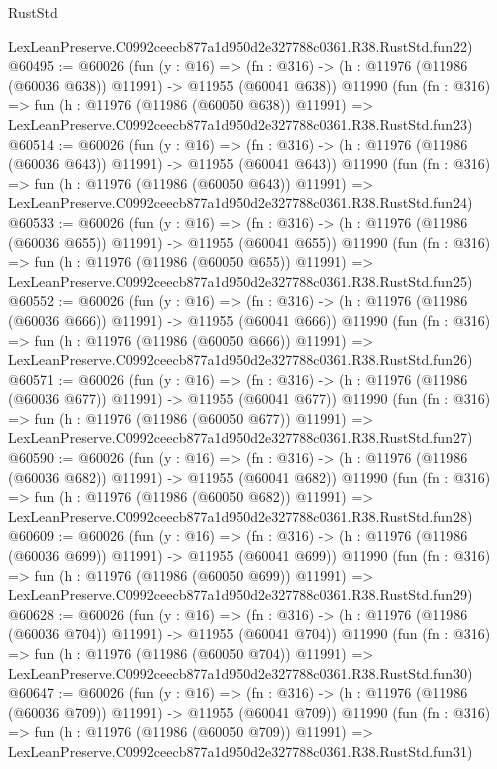\begin{lexlean}{RustStd}
\begin{coremodule}
    LexLeanPreserve.C0992ceecb877a1d950d2e327788c0361.R38.RustStd.fun22)
@60495 := @60026
    (fun (y : @16) =>
    (fn : @316) -> (h : @11976 (@11986 (@60036 @638)) @11991) -> @11955 (@60041 @638))
    @11990
    (fun (fn : @316) =>
    fun (h : @11976 (@11986 (@60050 @638)) @11991) =>
    LexLeanPreserve.C0992ceecb877a1d950d2e327788c0361.R38.RustStd.fun23)
@60514 := @60026
    (fun (y : @16) =>
    (fn : @316) -> (h : @11976 (@11986 (@60036 @643)) @11991) -> @11955 (@60041 @643))
    @11990
    (fun (fn : @316) =>
    fun (h : @11976 (@11986 (@60050 @643)) @11991) =>
    LexLeanPreserve.C0992ceecb877a1d950d2e327788c0361.R38.RustStd.fun24)
@60533 := @60026
    (fun (y : @16) =>
    (fn : @316) -> (h : @11976 (@11986 (@60036 @655)) @11991) -> @11955 (@60041 @655))
    @11990
    (fun (fn : @316) =>
    fun (h : @11976 (@11986 (@60050 @655)) @11991) =>
    LexLeanPreserve.C0992ceecb877a1d950d2e327788c0361.R38.RustStd.fun25)
@60552 := @60026
    (fun (y : @16) =>
    (fn : @316) -> (h : @11976 (@11986 (@60036 @666)) @11991) -> @11955 (@60041 @666))
    @11990
    (fun (fn : @316) =>
    fun (h : @11976 (@11986 (@60050 @666)) @11991) =>
    LexLeanPreserve.C0992ceecb877a1d950d2e327788c0361.R38.RustStd.fun26)
@60571 := @60026
    (fun (y : @16) =>
    (fn : @316) -> (h : @11976 (@11986 (@60036 @677)) @11991) -> @11955 (@60041 @677))
    @11990
    (fun (fn : @316) =>
    fun (h : @11976 (@11986 (@60050 @677)) @11991) =>
    LexLeanPreserve.C0992ceecb877a1d950d2e327788c0361.R38.RustStd.fun27)
@60590 := @60026
    (fun (y : @16) =>
    (fn : @316) -> (h : @11976 (@11986 (@60036 @682)) @11991) -> @11955 (@60041 @682))
    @11990
    (fun (fn : @316) =>
    fun (h : @11976 (@11986 (@60050 @682)) @11991) =>
    LexLeanPreserve.C0992ceecb877a1d950d2e327788c0361.R38.RustStd.fun28)
@60609 := @60026
    (fun (y : @16) =>
    (fn : @316) -> (h : @11976 (@11986 (@60036 @699)) @11991) -> @11955 (@60041 @699))
    @11990
    (fun (fn : @316) =>
    fun (h : @11976 (@11986 (@60050 @699)) @11991) =>
    LexLeanPreserve.C0992ceecb877a1d950d2e327788c0361.R38.RustStd.fun29)
@60628 := @60026
    (fun (y : @16) =>
    (fn : @316) -> (h : @11976 (@11986 (@60036 @704)) @11991) -> @11955 (@60041 @704))
    @11990
    (fun (fn : @316) =>
    fun (h : @11976 (@11986 (@60050 @704)) @11991) =>
    LexLeanPreserve.C0992ceecb877a1d950d2e327788c0361.R38.RustStd.fun30)
@60647 := @60026
    (fun (y : @16) =>
    (fn : @316) -> (h : @11976 (@11986 (@60036 @709)) @11991) -> @11955 (@60041 @709))
    @11990
    (fun (fn : @316) =>
    fun (h : @11976 (@11986 (@60050 @709)) @11991) =>
    LexLeanPreserve.C0992ceecb877a1d950d2e327788c0361.R38.RustStd.fun31)

\end{coremodule}
\end{lexlean}
